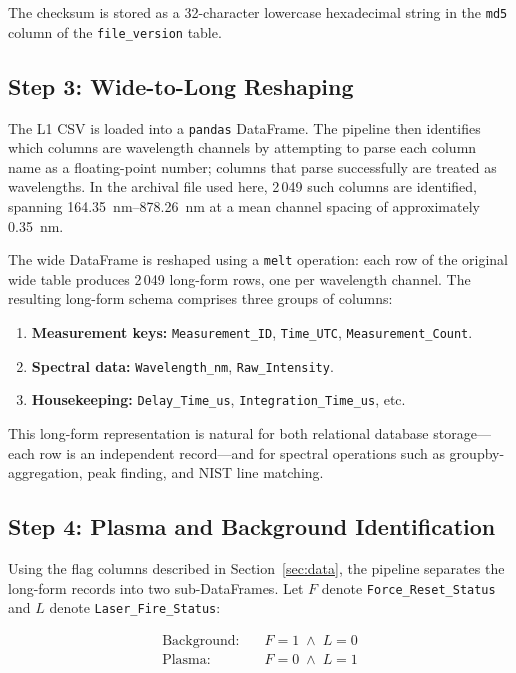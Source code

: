 \documentclass[a4paper,twocolumn,10pt]{article}
\begin{document}
The checksum is stored as a 32-character lowercase hexadecimal string
in the \texttt{md5} column of the \texttt{file\_version} table.

\subsection{Step 3: Wide-to-Long Reshaping}

The L1 CSV is loaded into a \texttt{pandas} DataFrame.  The pipeline
then identifies which columns are wavelength channels by attempting to
parse each column name as a floating-point number; columns that parse
successfully are treated as wavelengths.  In the archival file used
here, 2\,049 such columns are identified, spanning
\SIrange{164.35}{878.26}{\nano\metre} at a mean channel spacing of
approximately \SI{0.35}{\nano\metre}.

The wide DataFrame is reshaped using a \texttt{melt} operation: each
row of the original wide table produces 2\,049 long-form rows, one
per wavelength channel.  The resulting long-form schema comprises
three groups of columns:

\begin{enumerate}[nosep,leftmargin=*]
  \item \textbf{Measurement keys:} \texttt{Measurement\_ID},
    \texttt{Time\_UTC}, \texttt{Measurement\_Count}.
  \item \textbf{Spectral data:} \texttt{Wavelength\_nm},
    \texttt{Raw\_Intensity}.
  \item \textbf{Housekeeping:} \texttt{Delay\_Time\_us},
    \texttt{Integration\_Time\_us}, etc.
\end{enumerate}

This long-form representation is natural for both relational database
storage---each row is an independent record---and for spectral
operations such as groupby-aggregation, peak finding, and NIST line
matching.

\subsection{Step 4: Plasma and Background Identification}

Using the flag columns described in Section~\ref{sec:data}, the
pipeline separates the long-form records into two sub-DataFrames.
Let $F$ denote \texttt{Force\_Reset\_Status} and $L$ denote
\texttt{Laser\_Fire\_Status}:

\begin{align}
\label{eq:bg_mask}
\text{Background:}\quad & F = 1 \;\wedge\; L = 0 \\
\label{eq:plasma_mask}
\text{Plasma:}\quad & F = 0 \;\wedge\; L = 1
\end{align}
\end{document}
